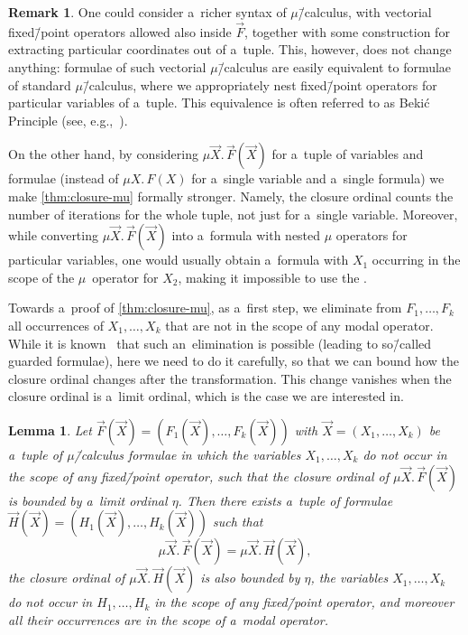 \documentclass[11pt,a4paper]{amsart}
\theoremstyle{plain}
\newtheorem{lem}[thm]{Lemma}
\theoremstyle{definition}
\newtheorem{rem}[thm]{Remark}
\theoremstyle{defC}
\theoremstyle{thmC}
\theoremstyle{plain}
\numberwithin{equation}{section}
\numberwithin{equation}{section}
\numberwithin{figure}{section}
\begin{document}
\begin{rem}
	One could consider a~richer syntax of $\mu$\=/calculus, with vectorial fixed\=/point operators allowed also inside $\vec{F}$, together with some construction for extracting particular coordinates out of a~tuple.
	This, however, does not change anything: formulae of such vectorial $\mu$\=/calculus are easily equivalent to formulae of standard $\mu$\=/calculus,
	where we appropriately nest fixed\=/point operators for particular variables of a~tuple. This equivalence is often referred to as Bekić Principle (see, e.g.,~\cite{Bekic1984}).

	On the other hand, by considering $\mu \vec{X}.\,\vec{F}(\vec{X})$ for a~tuple of variables and formulae (instead of $\mu X.\,F(X)$ for a~single variable and a~single formula)
	we make \cref{thm:closure-mu} formally stronger.
	Namely, the closure ordinal counts the number of iterations for the whole tuple, not just for a~single variable.
	Moreover, while converting $\mu \vec{X}.\,\vec{F}(\vec{X})$ into a~formula with nested $\mu$ operators for particular variables,
	one would usually obtain a~formula with $X_1$ occurring in the scope of the $\mu$~operator for $X_2$, making it impossible to use the .
\end{rem}

Towards a~proof of \cref{thm:closure-mu}, as a~first step, we eliminate from $F_1,\dots,F_k$ all occurrences of $X_1,\dots,X_k$ that are not in the scope of any modal operator.
While it is known~\cite{kozen-mu-calc} that such an~elimination is possible (leading to so\=/called guarded formulae), here we need to do it carefully,
so that we can bound how the closure ordinal changes after the transformation.
This change vanishes when the closure ordinal is a~limit ordinal, which is the case we are interested in.

\begin{lem}\label{lem:guarded}
	Let $\vec{F}(\vec{X})=(F_1(\vec{X}),\dots,F_k(\vec{X}))$ with $\vec{X}=(X_1,\dots,X_k)$ be a~tuple of $\mu$\=/calculus formulae in which the variables $X_1,\dots,X_k$ do not occur in the scope of any fixed\=/point operator,
	such that the closure ordinal of $\mu\vec{X}.\,\vec{F}(\vec{X})$ is bounded by a~limit ordinal $\eta$.
	Then there exists a~tuple of formulae $\vec{H}(\vec{X})=(H_1(\vec{X}),\dots,H_k(\vec{X}))$ such that
	\[
		\mu\vec{X}.\,\vec{F}(\vec{X}) = \mu\vec{X}.\,\vec{H}(\vec{X}),
	\]
	the closure ordinal of $\mu\vec{X}.\,\vec{H}(\vec{X})$ is also bounded by $\eta$,
	the variables $X_1,\dots,X_k$ do not occur in $H_1,\dots,H_k$ in the scope of any fixed\=/point operator,
	and moreover all their occurrences are in the scope of a~modal operator.
\end{lem}
\end{document}
